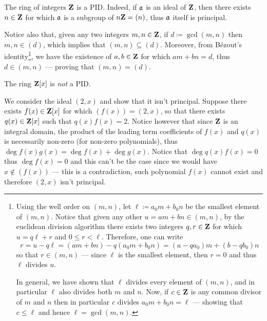 \begin{example}
\label{exp:integers-are-PID}
The ring of integers \(\mathbf{Z}\) is a PID. Indeed, if \(\mathfrak{a}\) is an ideal of
\(\mathbf{Z}\), then there exists \(n \in \mathbf{Z}\) for which \(\mathfrak{a}\) is a subgroup of
\(n \mathbf{Z} = (n)\), thus \(\mathfrak{a}\) itself is principal.

Notice also that, given any two integers \(m, n \in \mathbf{Z}\), if
\(d \coloneq \gcd(m, n)\) then \(m, n \in (d)\), which implies that
\((m, n) \subseteq (d)\). Moreover, from Bézout's identity\footnote{Using the
  well order on \((m, n)\), let \(\ell
  \coloneq a_0 m + b_0 n\) be the smallest element of \((m, n)\). Notice that
  given any other \(u = a m + b n \in (m, n)\), by the euclidean division
  algorithm there exists two integers \(q, r \in \mathbf{Z}\) for which \(u = q \ell +
  r\) and \(0 \leq r < \ell\). Therefore, one can write
  \[
  r = u - q \ell
  = (a m + b n) - q (a_0 m + b_0 n) = (a - q a_0) m + (b - q b_0) n
  \]
  so that \(r \in (m, n)\) --- since \(\ell\) is the smallest element, then \(r
  = 0\) and thus \(\ell\) divides \(u\).

  In general, we have shown that \(\ell\) divides every element of \((m, n)\),
  and in particular \(\ell\) also divides both \(m\) and \(n\). Now, if \(c \in
  \mathbf{Z}\) is any common divisor of \(m\) and \(n\) then in particular \(c\) divides
  \(a_0 m + b_0 n = \ell\) --- showing that \(c \leq \ell\) and hence \(\ell =
  \gcd(m, n)\).
},
we have the existence of \(a, b \in \mathbf{Z}\) for which \(a m + b n = d\), thus
\(d \in (m, n)\) --- proving that \((m, n) = (d)\).
\end{example}

\begin{example}
\label{exp:Z[x]-isnt-PID}
The ring \(\mathbf{Z}[x]\) is \emph{not} a PID.

We consider the ideal \((2, x)\) and show that it isn't principal. Suppose there
exists \(f(x) \in \mathbf{Z}[x]\) for which \((f(x)) = (2, x)\), so that there exists
\(q(x) \in \mathbf{Z}[x]\) such that \(q(x) f(x) = 2\). Notice however that since \(\mathbf{Z}\)
is an integral domain, the product of the leading term coefficients of \(f(x)\)
and \(q(x)\) is necessarily non-zero (for non-zero polynomials), thus
\(\deg f(x) g(x) = \deg f(x) + \deg g(x)\). Notice that \(\deg q(x) f(x) = 0\)
thus \(\deg f(x) = 0\) and this can't be the case since we would have
\(x \notin (f(x))\) --- this is a contradiction, such polynomial \(f(x)\) cannot
exist and therefore \((2, x)\) isn't principal.
\end{example}

